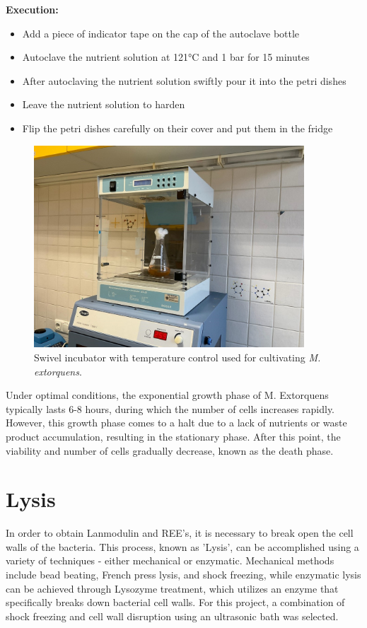\textbf{Execution:}
\begin{itemize}
    \item Add a piece of indicator tape on the cap of the autoclave bottle
    \item Autoclave the nutrient solution at 121°C and 1 bar for 15 minutes
    \item After autoclaving the nutrient solution swiftly pour it into the petri dishes
    \item Leave the nutrient solution to harden
    \item Flip the petri dishes carefully on their cover and put them in the fridge
\end{itemize}

\begin{figure}[H]
    \centering
    \includegraphics[width=0.9\textwidth]{./media/images/swivel_incubator}
    \caption{Swivel incubator with temperature control used for cultivating \emph{M. extorquens}.}
    \label{fig:swivel_incubator}
\end{figure}

Under optimal conditions, the exponential growth phase of M. Extorquens typically lasts
6-8 hours, during which the number of cells increases rapidly. However, this growth
phase comes to a halt due to a lack of nutrients or waste product accumulation, resulting
in the stationary phase. After this point, the viability and number of cells gradually
decrease, known as the death phase.


\section{Lysis}\label{sec:me_lysis}
In order to obtain Lanmodulin and REE's, it is necessary to break open the cell walls of
the bacteria. This process, known as 'Lysis', can be accomplished using a variety of
techniques - either mechanical or enzymatic. Mechanical methods include bead beating,
French press lysis, and shock freezing, while enzymatic lysis can be achieved through
Lysozyme treatment, which utilizes an enzyme that specifically breaks down bacterial cell
walls. For this project, a combination of shock freezing and cell wall disruption using an
ultrasonic bath was selected.



